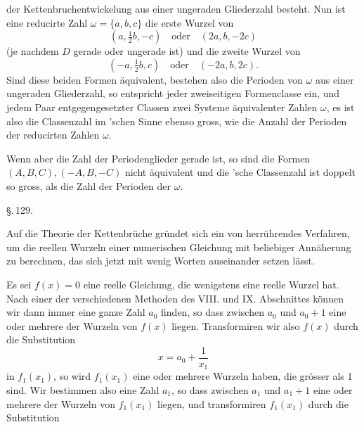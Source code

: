 der Kettenbruchentwickelung aus einer ungeraden Gliederzahl
besteht. Nun ist eine reducirte Zahl $\omega = \{a, b, c\}$ die erste
Wurzel von
\[
(a, \tfrac{1}{2}b, -c) \quad \text{oder} \quad (2a, b, -2c)
\]
(je nachdem $D$ gerade oder ungerade ist) und die zweite Wurzel von
\[
(-a, \tfrac{1}{2}b, c) \quad \text{oder} \quad (-2a, b, 2c).
\]
Sind diese beiden Formen äquivalent, bestehen also die
Perioden von $\omega$ aus einer ungeraden Gliederzahl, so entspricht
jeder zweiseitigen Formenclasse ein, und jedem Paar entgegengesetzter Classen zwei Systeme äquivalenter Zahlen $\omega$, es ist also
die Classenzahl im 'schen Sinne ebenso gross, wie die
Anzahl der Perioden der reducirten Zahlen $\omega$.

Wenn aber die Zahl der Periodenglieder gerade ist, so sind
die Formen $(A, B, C), (-A, B, -C)$ nicht äquivalent und die
'sche Classenzahl ist doppelt so gross, als die Zahl der
Perioden der $\omega$.

\begin{center}
\S.\,129.

\end{center}

Auf die Theorie der Kettenbrüche gründet sich ein von
 herrührendes Verfahren, um die reellen Wurzeln
einer numerischen Gleichung mit beliebiger Annäherung zu berechnen, das sich jetzt mit wenig Worten auseinander setzen
lässt.

Es sei $f(x) = 0$ eine reelle Gleichung, die wenigstens eine
reelle Wurzel hat. Nach einer der verschiedenen Methoden des
VIII. und IX. Abschnittes können wir dann immer eine ganze
Zahl $a_0$ finden, so dass zwischen $a_0$ und $a_0 + 1$ eine oder mehrere
der Wurzeln von $f(x)$ liegen. Transformiren wir also $f(x)$ durch
die Substitution
\[
x = a_0 + \frac{1}{x_1}
\]
in $f_1(x_1)$, so wird $f_1(x_1)$ eine oder mehrere Wurzeln haben, die
grösser als 1 sind. Wir bestimmen also eine 
Zahl $a_1$, so dass zwischen $a_1$ und $a_1 + 1$ eine oder mehrere der
Wurzeln von $f_1(x_1)$ liegen, und transformiren $f_1(x_1)$ durch die
Substitution
